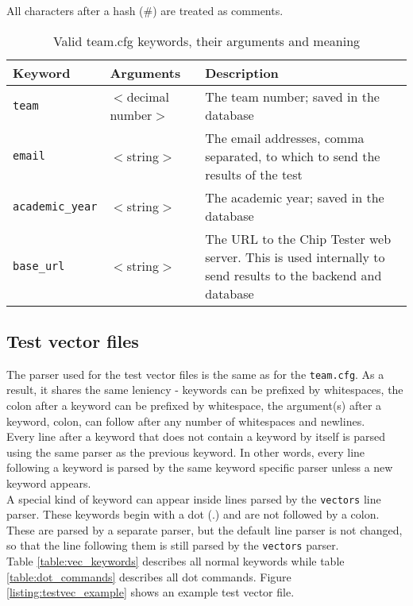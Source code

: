 All characters after a hash (\#) are treated as comments.

\begin{table}[h!]
\centering
\begin{tabular}{ | l | l | p{6cm} | }
 \hline
   Keyword       & Arguments & Description \\
 \hline
   \texttt{team} & $<$decimal number$>$ & The team number; saved in the database \\
 \hline
   \texttt{email} & $<$string$>$ & The email addresses, comma separated, to which to send the results of the test \\
 \hline
   \texttt{academic\_year} & $<$string$>$ & The academic year; saved in the database \\
 \hline
   \texttt{base\_url} & $<$string$>$ & The URL to the Chip Tester web server. This is used internally to send results to the backend and database \\
 \hline
\end{tabular}
\caption{Valid team.cfg keywords, their arguments and meaning}
\label{table:teamcfg_keywords}
\end{table}

\newpage
\subsection{Test vector files}
The parser used for the test vector files is the same as for the \texttt{team.cfg}.
As a result, it shares the same leniency - keywords can be prefixed by whitespaces,
the colon after a keyword can be prefixed by whitespace, the argument(s) after a
keyword, colon, can follow after any number of whitespaces and newlines.
\\

Every line after a keyword that does not contain a keyword by itself is parsed
using the same parser as the previous keyword. In other words, every line following
a keyword is parsed by the same keyword specific parser unless a new keyword appears.
\\

A special kind of keyword can appear inside lines parsed by the \texttt{vectors} line
parser. These keywords begin with a dot (.) and are not followed by a colon. These
are parsed by a separate parser, but the default line parser is not changed, so that
the line following them is still parsed by the \texttt{vectors} parser.
\\

Table \ref{table:vec_keywords} describes all normal keywords while table 
\ref{table:dot_commands} describes all dot commands.
Figure \ref{listing:testvec_example} shows an example test vector file.

